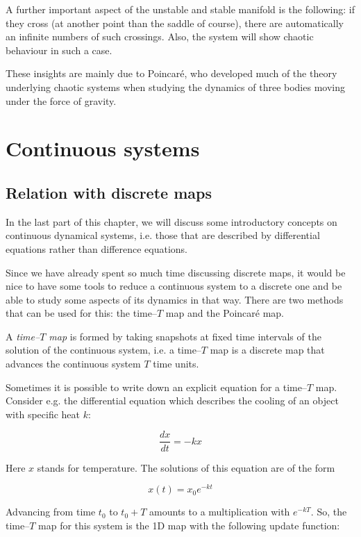 A further important aspect of the unstable and stable manifold is the following: if they cross (at another point than the saddle of course), there are automatically an infinite numbers of such crossings. Also, the system will show chaotic behaviour in such a case.

These insights are mainly due to Poincar\'{e}, who developed much of the theory underlying chaotic systems when studying the dynamics of three bodies moving under the force of gravity.
 
\section{Continuous systems}

\subsection{Relation with discrete maps}

In the last part of this chapter, we will discuss some introductory concepts on continuous dynamical systems, i.e. those that are described by differential equations rather than difference equations.

Since we have already spent so much time discussing discrete maps, it would be nice to have some tools to reduce a continuous system to a discrete one and be able to study some aspects of its dynamics in that way. There are two methods that can be used for this: the time--$T$ map and the Poincar\'{e} map.

A \emph{time--$T$ map} is formed by taking snapshots at fixed time intervals of the solution of the continuous system, i.e. a time--$T$ map is a discrete map that advances the continuous system $T$ time units. 

Sometimes it is possible to write down an explicit equation for a time--$T$ map. Consider e.g. the differential equation which describes the cooling of an object with specific heat $k$:

\begin{equation}
\frac{dx}{dt} = -k x
\end{equation} 

Here $x$ stands for temperature. The solutions of this equation are of the form

\begin{equation}
x(t) = x_0 e^{-kt}
\end{equation} 

Advancing from time $t_0$ to $t_0+T$ amounts to a multiplication with $e^{-kT}$. So, the time--$T$ map for this system is the 1D map with the following update function:

